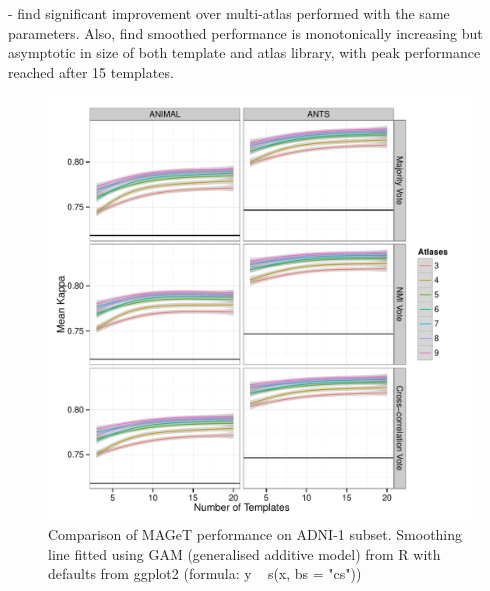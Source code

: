 \documentclass{article}\usepackage{graphicx, color}
\makeatletter
\def\maxwidth{ %
  \ifdim\Gin@nat@width>\linewidth
    \linewidth
  \else
    \Gin@nat@width
  \fi
}
\newenvironment{kframe}{%
 \def\at@end@of@kframe{}%
 \ifinner\ifhmode%
  \def\at@end@of@kframe{\end{minipage}}%
  \begin{minipage}{\columnwidth}%
 \fi\fi%
 \def\FrameCommand##1{\hskip\@totalleftmargin \hskip-\fboxsep
 \colorbox{shadecolor}{##1}\hskip-\fboxsep
     \hskip-\linewidth \hskip-\@totalleftmargin \hskip\columnwidth}%
 \MakeFramed {\advance\hsize-\width
   \@totalleftmargin\z@ \linewidth\hsize
   \@setminipage}}%
 {\par\unskip\endMakeFramed%
 \at@end@of@kframe}
\newenvironment{knitrout}{}{} %
\newcommand{\todo}[1]{\begin{kframe}{\textcolor{red}{TODO #1}}\end{kframe}}
\makeatother
\begin{document}
 - find significant improvement over multi-atlas performed with the same
  parameters. Also, find smoothed performance is monotonically increasing but asymptotic
  in size of both template and atlas library, with peak performance reached after 15
  templates. \todo{Can we statistically capture "peak" performance?  The point at which 
  gains become statistically insignificant?}

\begin{figure}
\begin{knitrout}
\color{fgcolor}

{\centering \includegraphics[width=\maxwidth]{figure/ADNI1_cross_validation_means} 

}


\end{knitrout}

  \caption{Comparison of MAGeT performance on ADNI-1 subset.  Smoothing line fitted using GAM (generalised additive model) from R with defaults from ggplot2 (formula: y ~ s(x, bs = "cs"))}
  \label{ADNI1_cross_validation_means}
\end{figure}
\end{document}
